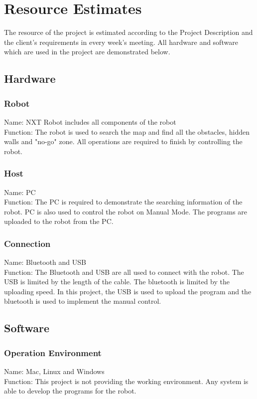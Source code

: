 \documentclass[11pt, a4paper]{report}
\begin{document}
\pagebreak




\chapter{Resource Estimates} %
\label{cha:RE}
The resource of the project is estimated according to the Project Description and the client's requirements in every week's meeting. All hardware and software which are used in the project are demonstrated below.
\section{Hardware}
\subsection{Robot}
Name: NXT Robot includes all components of the robot\\
Function: The robot is used to search the map and find all the obstacles, hidden walls and "no-go" zone. All operations are required to finish by controlling the robot.
\subsection{Host}
Name: PC\\
Function: The PC is required to demonstrate the searching information of the robot. PC is also used to control the robot on Manual Mode. The programs are uploaded to the robot from the PC.
\subsection{Connection}
Name: Bluetooth and USB \\
Function: The Bluetooth and USB are all used to connect with the robot. The USB is limited by the length of the cable. The bluetooth is limited by the uploading speed. In this project, the USB is used to upload the program and the bluetooth is used to implement the manual control.
\section{Software}
\subsection{Operation Environment}
Name: Mac, Linux and Windows\\
Function: This project is not providing the working environment. Any system is able to develop the programs for the robot.
\end{document}
